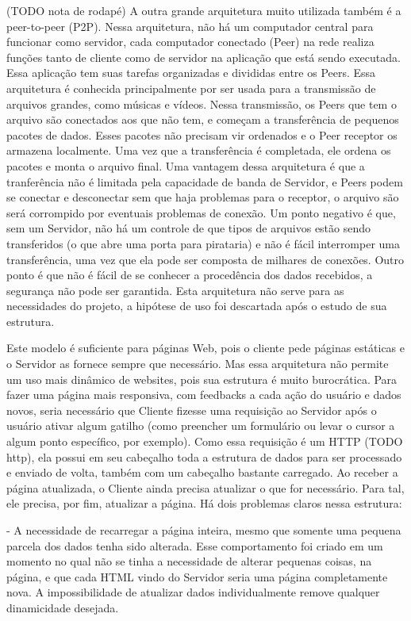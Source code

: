 \documentclass[a4paper,12pt]{article}
\begin{document}
(TODO nota de rodapé)
A outra grande arquitetura muito utilizada também é a peer-to-peer (P2P). Nessa arquitetura, não há um computador central para funcionar como servidor, cada computador conectado (Peer) na rede realiza funções tanto de cliente como de servidor na aplicação que está sendo executada. Essa aplicação tem suas tarefas organizadas e divididas entre os Peers.
Essa arquitetura é conhecida principalmente por ser usada para a transmissão de arquivos grandes, como músicas e vídeos. Nessa transmissão, os Peers que tem o arquivo são conectados aos que não tem, e começam a transferência de pequenos pacotes de dados. Esses pacotes não precisam vir ordenados e o Peer receptor os armazena localmente. Uma vez que a transferência é completada, ele ordena os pacotes e monta o arquivo final. Uma vantagem dessa arquitetura é que a tranferência não é limitada pela capacidade de banda de Servidor, e Peers podem se conectar e desconectar sem que haja problemas para o receptor, o arquivo são será corrompido por eventuais problemas de conexão. Um ponto negativo é que, sem um Servidor, não há um controle de que tipos de arquivos estão sendo transferidos (o que abre uma porta para pirataria) e não é fácil interromper uma transferência, uma vez que ela pode ser composta de milhares de conexões. Outro ponto é que não é fácil de se conhecer a procedência dos dados recebidos, a segurança não pode ser garantida.
Esta arquitetura não serve para as necessidades do projeto, a hipótese de uso foi descartada após o estudo de sua estrutura.


Este modelo é suficiente para páginas Web, pois o cliente pede páginas estáticas e o Servidor as fornece sempre que necessário. Mas essa arquitetura não permite um uso mais dinâmico de websites, pois sua estrutura é muito burocrática. Para fazer uma página mais responsiva, com feedbacks a cada ação do usuário e dados novos, seria necessário que Cliente fizesse uma requisição ao Servidor após o usuário ativar algum gatilho (como preencher um formulário ou levar o cursor a algum ponto específico, por exemplo). Como essa requisição é um HTTP (TODO http), ela possui em seu cabeçalho toda a estrutura de dados para ser processado e enviado de volta, também com um cabeçalho bastante carregado. Ao receber a página atualizada, o Cliente ainda precisa atualizar o que for necessário. Para tal, ele precisa, por fim, atualizar a página. Há dois problemas claros nessa estrutura:

- A necessidade de recarregar a página inteira, mesmo que somente uma pequena parcela dos dados tenha sido alterada. Esse comportamento foi criado em um momento no qual não se tinha a necessidade de alterar pequenas coisas, na página, e que cada HTML vindo do Servidor seria uma página completamente nova. A impossibilidade de atualizar dados individualmente remove qualquer dinamicidade desejada.
\end{document}
